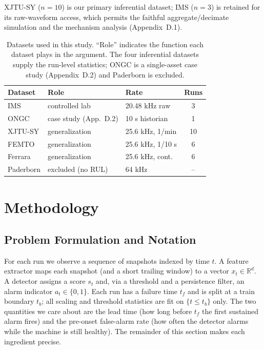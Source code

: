 \documentclass[IJPHM, 2026, 0]{PHMSociety}
\begin{document}
XJTU-SY ($n=10$) is our primary inferential dataset; IMS ($n=3$) is retained for its raw-waveform access, which permits the faithful aggregate/decimate simulation and the mechanism analysis (Appendix~D.1).

\begin{table}[t] \small
	\begin{center}
	\caption{Datasets used in this study. ``Role'' indicates the function each dataset plays in the argument. The four inferential datasets supply the run-level statistics; ONGC is a single-asset case study (Appendix~D.2) and Paderborn is excluded.}
	\label{tab:datasets}
	\begin{tabular}{l l l c}
		\hline \hline
		\textbf{Dataset} & \textbf{Role} & \textbf{Rate} & \textbf{Runs} \\
		\hline
		IMS & controlled lab & 20.48 kHz raw & 3 \\
		ONGC & case study (App.~D.2) & 10 s historian & 1 \\
		XJTU-SY & generalization & 25.6 kHz, 1/min & 10 \\
		FEMTO & generalization & 25.6 kHz, 1/10 s & 6 \\
		Ferrara & generalization & 25.6 kHz, cont. & 6 \\
		Paderborn & excluded (no RUL) & 64 kHz & -- \\
		\hline \hline
	\end{tabular}
	\end{center}
\end{table}


\section{Methodology}

\subsection{Problem Formulation and Notation}
For each run we observe a sequence of snapshots indexed by time $t$. A feature extractor maps each snapshot (and a short trailing window) to a vector $x_t \in \mathbb{R}^d$. A detector assigns a score $s_t$ and, via a threshold and a persistence filter, an alarm indicator $a_t \in \{0,1\}$. Each run has a failure time $t_f$ and is split at a train boundary $t_b$; all scaling and threshold statistics are fit on $\{t \le t_b\}$ only. The two quantities we care about are the lead time (how long before $t_f$ the first sustained alarm fires) and the pre-onset false-alarm rate (how often the detector alarms while the machine is still healthy). The remainder of this section makes each ingredient precise.
\end{document}
